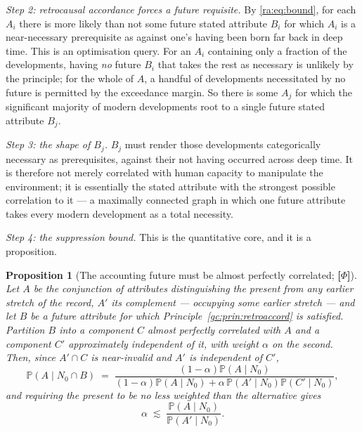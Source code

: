 \documentclass[11pt]{article}
\numberwithin{equation}{section}
\theoremstyle{plain}
\newtheorem{proposition}[theorem]{Proposition}
\theoremstyle{definition}
\theoremstyle{remark}
\newcommand{\PP}{\mathbb{P}}
\begin{document}
\emph{Step 2: retrocausal accordance forces a future requisite.} By
\eqref{ra:eq:bound}, for each $A_i$ there is more likely than not some
future stated attribute $B_i$ for which $A_i$ is a near-necessary
prerequisite as against one's having been born far back in deep time.
This is an optimisation query. For an $A_i$ containing only a fraction
of the developments, having \emph{no} future $B_i$ that takes the rest
as necessary is unlikely by the principle; for the whole of $A$, a
handful of developments necessitated by no future is permitted by the
exceedance margin. So there is some $A_j$ for which the significant
majority of modern developments root to a single future stated attribute
$B_j$.

\emph{Step 3: the shape of $B_j$.} $B_j$ must render those developments
categorically necessary as prerequisites, against their not having
occurred across deep time. It is therefore not merely correlated with
human capacity to manipulate the environment; it is essentially the
stated attribute with the strongest possible correlation to it --- a
maximally connected graph in which one future attribute takes every
modern development as a total necessity.

\emph{Step 4: the suppression bound.} This is the quantitative core, and
it is a proposition.

\begin{proposition}[The accounting future must be almost perfectly
correlated; \textbf{[$\Phi$]}]\label{gc:prop:alpha}
Let $A$ be the conjunction of attributes distinguishing the present from
any earlier stretch of the record, $A'$ its complement --- occupying some
earlier stretch --- and let $B$ be a future attribute for which
Principle~\ref{gc:prin:retroaccord} is satisfied. Partition $B$ into a
component $C$ almost perfectly correlated with $A$ and a component $C'$
approximately independent of it, with weight $\alpha$ on the second.
Then, since $A'\cap C$ is near-invalid and $A'$ is independent of $C'$,
\begin{equation}\label{gc:eq:alpha}
\PP(A\mid N_0\cap B)\;=\;
\frac{(1-\alpha)\PP(A\mid N_0)}
{(1-\alpha)\PP(A\mid N_0)+\alpha\,\PP(A'\mid N_0)\PP(C'\mid N_0)},
\end{equation}
and requiring the present to be no less weighted than the alternative
gives
\begin{equation}\label{gc:eq:alphabound}
\alpha\;\lesssim\;\frac{\PP(A\mid N_0)}{\PP(A'\mid N_0)} .
\end{equation}
\end{proposition}
\end{document}
